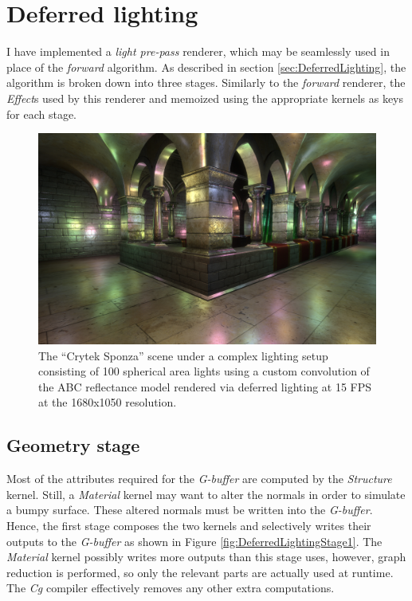 \clearpage
\section{Deferred lighting}
\label{sec:DeferredLightingExample}

I have implemented a \emph{light pre-pass} renderer, which may be seamlessly used in place of the \emph{forward} algorithm. As described in section \ref{sec:DeferredLighting}, the algorithm is broken down into three stages. Similarly to the \emph{forward} renderer, the \emph{Effect}s used by this renderer and memoized using the appropriate kernels as keys for each stage.

\begin{figure}[h!]
  \centering
    \includegraphics[width=0.9\linewidth]{./Figures/lightPrePass/sponza.jpg}
    \caption[Light pre-pass rendering of Sponza]{The ``Crytek Sponza'' scene under a complex lighting setup consisting of 100 spherical area lights using a custom convolution of the ABC reflectance model rendered via deferred lighting at 15 FPS at the 1680x1050 resolution.}
  \label{fig:lightPrePassSponza}
\end{figure}

\subsection{Geometry stage}

Most of the attributes required for the \emph{G-buffer} are computed by the \emph{Structure} kernel. Still, a \emph{Material} kernel may want to alter the normals in order to simulate a bumpy surface. These altered normals must be written into the \emph{G-buffer}. Hence, the first stage composes the two kernels and selectively writes their outputs to the \emph{G-buffer} as shown in Figure \ref{fig:DeferredLightingStage1}. The \emph{Material} kernel possibly writes more outputs than this stage uses, however, graph reduction is performed, so only the relevant parts are actually used at runtime. The \emph{Cg} compiler effectively removes any other extra computations.


